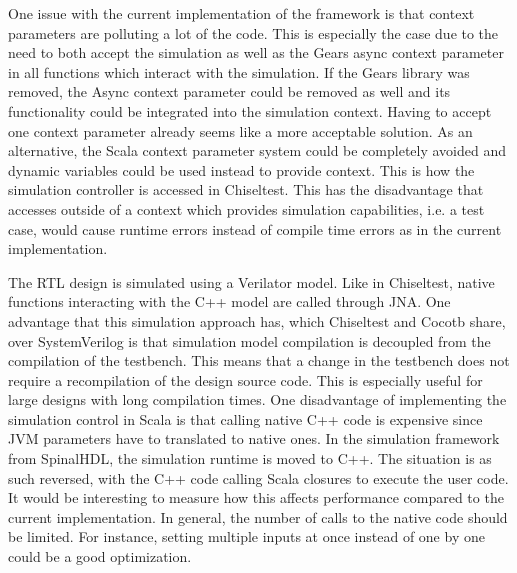 One issue with the current implementation of the framework is that context parameters are polluting a lot of the code. This is especially the case due to the need to both accept the simulation as well as the Gears async context parameter in all functions which interact with the simulation. If the Gears library was removed, the Async context parameter could be removed as well and its functionality could be integrated into the simulation context. Having to accept one context parameter already seems like a more acceptable solution. As an alternative, the Scala context parameter system could be completely avoided and dynamic variables could be used instead to provide context. This is how the simulation controller is accessed in Chiseltest. This has the disadvantage that accesses outside of a context which provides simulation capabilities, i.e. a test case, would cause runtime errors instead of compile time errors as in the current implementation. 


The RTL design is simulated using a Verilator model. Like in Chiseltest, native functions interacting with the C++ model are called through JNA. One advantage that this simulation approach has, which Chiseltest and Cocotb share, over SystemVerilog is that simulation model compilation is decoupled from the compilation of the testbench. This means that a change in the testbench does not require a recompilation of the design source code. This is especially useful for large designs with long compilation times. One disadvantage of implementing the simulation control in Scala is that calling native C++ code is expensive since JVM parameters have to translated to native ones. In the simulation framework from SpinalHDL, the simulation runtime is moved to C++. The situation is as such reversed, with the C++ code calling Scala closures to execute the user code. It would be interesting to measure how this affects performance compared to the current implementation. In general, the number of calls to the native code should be limited. For instance, setting multiple inputs at once instead of one by one could be a good optimization.

